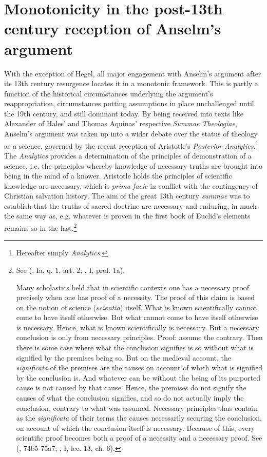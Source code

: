 \documentclass[]{birkjour}
\begin{document}
\section{Monotonicity in the post-13th century reception of Anselm's argument}
With the exception of Hegel, all major engagement with Anselm's argument after its 13th century resurgence locates it in a monotonic framework. This is partly a function of the historical circumstances underlying the argument's reappropriation, circumstances putting assumptions in place unchallenged until the 19th century, and still dominant today. By being received into texts like Alexander of Hales' and Thomas Aquinas' respective \textit{Summae Theologiae}, Anselm's argument was taken up into a wider debate over the status of theology as a science, governed by the recent reception of Aristotle's \textit{Posterior Analytics}.\footnote{Hereafter simply \textit{Analytics}.}  The \textit{Analytics} provides a determination of the principles of demonstration of a science, i.e. the principles whereby knowledge of necessary truths are brought into being in the mind of a knower. Aristotle holds the principles of scientific knowledge are necessary, which is \textit{prima facie} in conflict with the contingency of Christian salvation history. The aim of the great 13th century \textit{summae} was to establish that the truths of sacred doctrine are necessary and enduring, in much the same way as, e.g. whatever is proven in the first book of Euclid's elements remains so in the last.\footnote{See (\cite{AquinasST}, Ia, q. 1, art. 2; \cite{ScotusOrd}, I, prol. 1a).

Many scholastics held that in scientific contexts one has a necessary proof precisely when one has proof of a necessity. The proof of this claim is based on the notion of science (\textit{scientia}) itself. What is known scientifically cannot come to have itself otherwise. But what cannot come to have itself otherwise is necessary. Hence, what is known scientifically is necessary. But a necessary conclusion is only from necessary principles. Proof: assume the contrary. Then there is some case where what the conclusion signifies is so without what is signified by the premises being so. But on the medieval account, the \textit{significata} of the premises are the causes on account of which what is signified by the conclusion is. And whatever can be without the being of its purported cause is not caused by that cause. Hence, the premises do not signify the causes of what the conclusion signifies, and so do not actually imply the conclusion, contrary to what was assumed. Necessary principles thus contain as the \textit{significata} of their terms the causes necessarily securing the conclusion, on account of which the conclusion itself is necessary. Because of this, every scientific proof becomes both a proof of a necessity and a necessary proof. See (\cite{Post.An}, 74b5-75a7; \cite{AquinasPA}, I, lec. 13, ch. 6).}
\end{document}
